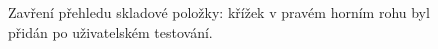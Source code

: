 \begin{figure}[h]
\caption[Zavření přehledu skladové položky]{Zavření přehledu skladové položky: křížek v pravém horním rohu byl přidán po uživatelském testování.} \label{picture:test:close_bottom_sheet}
\end{figure}
